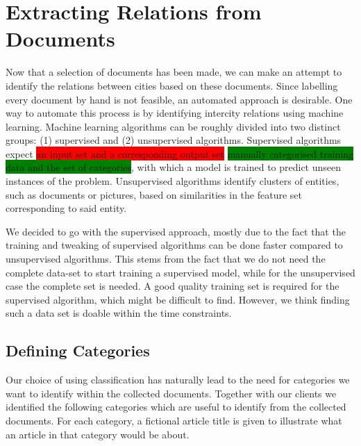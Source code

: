 \section{Extracting Relations from Documents}\label{sec:classification-design}
Now that a selection of documents has been made, we can make an attempt to identify the relations between cities based on these documents. Since labelling every document by hand is not feasible, an automated approach is desirable. 
One way to automate this process is by identifying intercity relations using machine learning. Machine learning algorithms can be roughly divided into two distinct groups: (1) supervised and (2) unsupervised algorithms. Supervised algorithms expect \colorbox{red}{an input set and a corresponding output set} \colorbox{green}{manually categorised training data and the set of categories}, with which a model is trained to predict unseen instances of the problem. Unsupervised algorithms identify clusters of entities, such as documents or pictures, based on similarities in the feature set corresponding to said entity.

We decided to go with the supervised approach, mostly due to the fact that the training and tweaking of supervised algorithms can be done faster compared to unsupervised algorithms. This stems from the fact that we do not need the complete data-set to start training a supervised model, while for the unsupervised case the complete set is needed. A good quality training set is required for the supervised algorithm, which might be difficult to find. However, we think finding such a data set is doable within the time constraints.

\subsection{Defining Categories}
Our choice of using classification has naturally lead to the need for categories we want to identify within the collected documents. Together with our clients we identified the following categories which are useful to identify from the collected documents. For each category, a fictional article title is given to illustrate what an article in that category would be about.\\

